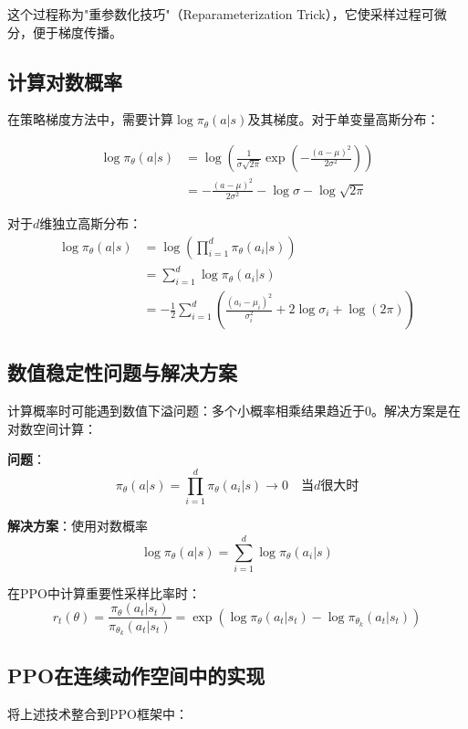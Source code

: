 这个过程称为"重参数化技巧"（Reparameterization Trick），它使采样过程可微分，便于梯度传播。

\subsection{计算对数概率}

在策略梯度方法中，需要计算$\log \pi_\theta(a|s)$及其梯度。对于单变量高斯分布：

\begin{align*}
\log \pi_\theta(a|s) &= \log\left(\frac{1}{\sigma\sqrt{2\pi}} \exp\left(-\frac{(a - \mu)^2}{2\sigma^2}\right)\right) \\
&= -\frac{(a - \mu)^2}{2\sigma^2} - \log\sigma - \log\sqrt{2\pi}
\end{align*}

对于$d$维独立高斯分布：
\begin{align*}
\log \pi_\theta(a|s) &= \log\left(\prod_{i=1}^{d} \pi_\theta(a_i|s)\right) \\
&= \sum_{i=1}^{d} \log \pi_\theta(a_i|s) \\
&= -\frac{1}{2}\sum_{i=1}^{d}\left(\frac{(a_i - \mu_i)^2}{\sigma_i^2} + 2\log\sigma_i + \log(2\pi)\right)
\end{align*}

\subsection{数值稳定性问题与解决方案}

计算概率时可能遇到数值下溢问题：多个小概率相乘结果趋近于0。解决方案是在对数空间计算：

\textbf{问题}：
\[
\pi_\theta(a|s) = \prod_{i=1}^{d} \pi_\theta(a_i|s) \to 0 \quad \text{当$d$很大时}
\]

\textbf{解决方案}：使用对数概率
\[
\log \pi_\theta(a|s) = \sum_{i=1}^{d} \log \pi_\theta(a_i|s)
\]

在PPO中计算重要性采样比率时：
\[
r_t(\theta) = \frac{\pi_\theta(a_t|s_t)}{\pi_{\theta_k}(a_t|s_t)} = \exp\left(\log \pi_\theta(a_t|s_t) - \log \pi_{\theta_k}(a_t|s_t)\right)
\]

\subsection{PPO在连续动作空间中的实现}

将上述技术整合到PPO框架中：

